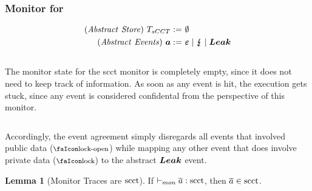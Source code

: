 \documentclass[dvipsnames,conference]{IEEEtran}
\theoremstyle{definition}
\newtheorem{lemma}{Lemma}[section]
\begin{document}
\subsubsection{Monitor for }
\begin{gather*}
  \begin{aligned}
    \mathit{(Abstract\ Store)}~T_{sCCT}{}:=&\ \emptyset \\
    \mathit{(Abstract\ Events)}~\bm{a}:=&\ \bm{\varepsilon} \mid \lightning{\kern-5.5pt}\lightning \mid \bm{Leak} \\
  \end{aligned}
\end{gather*}
\begin{center}
  $\;$\\
\end{center}
The monitor state for the \gls*{scct} monitor is completely empty, since it does not need to keep track of information.
As soon as any event is hit, the execution gets stuck, since any event is considered confidental from the perspective of this monitor.
\begin{center}
  $\;$\\
\end{center}
Accordingly, the event agreement simply disregards all events that involved public data ($\unlock$) while mapping any other event that does involve private data ($\lock$) to the abstract $\bm{Leak}$ event.

\begin{lemma}[Monitor Traces are $\operatorname{scct}$]\label{lem:mon:scctsafe}
  If $\vdash_{mon}{\overline{a}}:{\operatorname{scct}}$, then $\overline{a}\in\operatorname{scct}$. %
\end{lemma}
\end{document}
